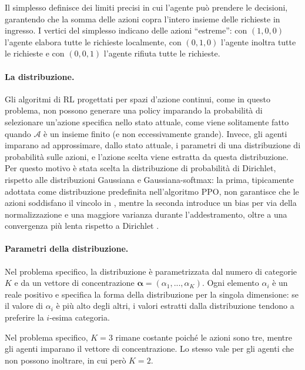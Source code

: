 Il simplesso definisce dei limiti precisi in cui l'agente può prendere le decisioni, garantendo che la somma delle azioni copra l'intero insieme delle richieste in ingresso. I vertici del simplesso indicano delle azioni ``estreme'': con $(1, 0, 0)$ l'agente elabora tutte le richieste localmente, con $(0, 1, 0)$ l'agente inoltra tutte le richieste e con $(0, 0, 1)$ l'agente rifiuta tutte le richieste.

\paragraph{La distribuzione.} Gli algoritmi di RL progettati per spazi d'azione continui, come in questo problema, non possono generare una policy imparando la probabilità di selezionare un'azione specifica nello stato attuale, come viene solitamente fatto quando $\mathcal{A}$ è un insieme finito (e non eccessivamente grande). Invece, gli agenti imparano ad approssimare, dallo stato attuale, i parametri di una distribuzione di probabilità sulle azioni, e l'azione scelta viene estratta da questa distribuzione. Per questo motivo è stata scelta la distribuzione di probabilità di Dirichlet, rispetto alle distribuzioni Gaussiana e Gaussiana-softmax: la prima, tipicamente adottata come distribuzione predefinita nell'algoritmo PPO, non garantisce che le azioni soddisfano il vincolo in , mentre la seconda introduce un bias per via della normalizzazione e una maggiore varianza durante l'addestramento, oltre a una convergenza più lenta rispetto a Dirichlet \cite{Tian2022}.

\paragraph{Parametri della distribuzione.} Nel problema specifico, la distribuzione è parametrizzata dal numero di categorie $K$ e da un vettore di concentrazione $\boldsymbol{\alpha} = (\alpha_1, ..., \alpha_K)$. Ogni elemento $\alpha_i$ è un reale positivo e specifica la forma della distribuzione per la singola dimensione: se il valore di $\alpha_i$ è più alto degli altri, i valori estratti dalla distribuzione tendono a preferire la $i$-esima categoria. 

Nel problema specifico, $K = 3$ rimane costante poiché le azioni sono tre, mentre gli agenti imparano il vettore di concentrazione. Lo stesso vale per gli agenti che non possono inoltrare, in cui però $K = 2$.


